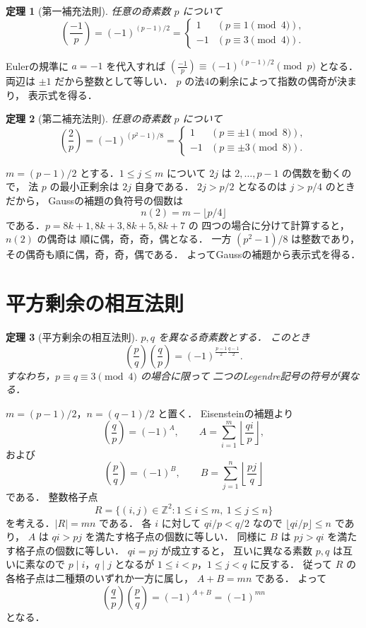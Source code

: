 \documentclass[a5paper,10pt,onecolumn]{jsarticle}
\makeatletter
\theoremstyle{mathnotetheorem}
\newtheorem{theorem}{定理}[section]
\renewcommand{\proofname}{証明}
\renewenvironment{proof}[1][\proofname]{%
  \par\pushQED{\qed}\normalfont\topsep4\p@\@plus2\p@\relax
  \trivlist\item[\hskip\labelsep\bfseries #1]\ignorespaces
}{\popQED\endtrivlist\@endpefalse}
\makeatother
\begin{document}
\begin{theorem}[第一補充法則]\label{thm:first}
任意の奇素数 $p$ について
\[
 \left(\frac{-1}{p}\right)=(-1)^{(p-1)/2}
 =
 \begin{cases}
 1&(p\equiv1\pmod4),\\
 -1&(p\equiv3\pmod4).
 \end{cases}
\]
\end{theorem}
\begin{proof}
Eulerの規準に $a=-1$ を代入すれば
$\left(\frac{-1}{p}\right)\equiv(-1)^{(p-1)/2}\pmod p$
となる．両辺は $\pm1$ だから整数として等しい．
$p$ の法4の剰余によって指数の偶奇が決まり，
表示式を得る．
\end{proof}

\begin{theorem}[第二補充法則]\label{thm:second}
任意の奇素数 $p$ について
\[
 \left(\frac2p\right)=(-1)^{(p^2-1)/8}
 =
 \begin{cases}
 1&(p\equiv\pm1\pmod8),\\
 -1&(p\equiv\pm3\pmod8).
 \end{cases}
\]
\end{theorem}
\begin{proof}
$m=(p-1)/2$ とする．$1\le j\le m$ について
$2j$ は $2,\dots,p-1$ の偶数を動くので，
法 $p$ の最小正剰余は $2j$ 自身である．
$2j>p/2$ となるのは $j>p/4$ のときだから，
Gaussの補題の負符号の個数は
\[
 n(2)=m-\lfloor p/4\rfloor
\]
である．$p=8k+1,8k+3,8k+5,8k+7$ の
四つの場合に分けて計算すると，$n(2)$ の偶奇は
順に偶，奇，奇，偶となる．
一方 $(p^2-1)/8$ は整数であり，
その偶奇も順に偶，奇，奇，偶である．
よってGaussの補題から表示式を得る．
\end{proof}

\section{平方剰余の相互法則}

\begin{theorem}[平方剰余の相互法則]\label{thm:qr}
$p,q$ を異なる奇素数とする．
このとき
\[
 \left(\frac pq\right)\left(\frac qp\right)
 =(-1)^{\frac{p-1}{2}\frac{q-1}{2}}.
\]
すなわち，$p\equiv q\equiv3\pmod4$ の場合に限って
二つのLegendre記号の符号が異なる．
\end{theorem}
\begin{proof}
$m=(p-1)/2$，$n=(q-1)/2$ と置く．
Eisensteinの補題より
\[
 \left(\frac qp\right)
 =(-1)^{A},\qquad
 A=\sum_{i=1}^m\left\lfloor\frac{qi}{p}\right\rfloor,
\]
および
\[
 \left(\frac pq\right)
 =(-1)^{B},\qquad
 B=\sum_{j=1}^n\left\lfloor\frac{pj}{q}\right\rfloor
\]
である．
整数格子点
\[
 R=\{(i,j)\in\mathbb Z^2:
 1\le i\le m,\ 1\le j\le n\}
\]
を考える．$|R|=mn$ である．
各 $i$ に対して $qi/p<q/2$ なので
$\lfloor qi/p\rfloor\le n$ であり，
$A$ は $qi>pj$ を満たす格子点の個数に等しい．
同様に $B$ は $pj>qi$ を満たす格子点の個数に等しい．
$qi=pj$ が成立すると，
互いに異なる素数 $p,q$ は互いに素なので
$p\mid i$，$q\mid j$ となるが
$1\le i<p$，$1\le j<q$ に反する．
従って $R$ の各格子点は二種類のいずれか一方に属し，
$A+B=mn$ である．
よって
\[
 \left(\frac qp\right)\left(\frac pq\right)
 =(-1)^{A+B}=(-1)^{mn}
\]
となる．
\end{proof}
\end{document}
